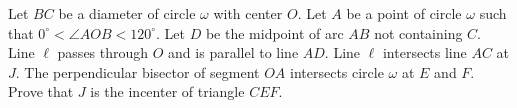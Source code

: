 Let $BC$ be a diameter of circle $\omega$ with center $O$. Let $A$ be a point
of circle $\omega$ such that $0^\circ < \angle AOB < 120^\circ$. Let $D$ be the midpoint
of arc $AB$ not containing $C$. Line $\ell$ passes through $O$ and is
parallel to line $AD$. Line $\ell$ intersects line $AC$ at $J$.
The perpendicular bisector of segment $OA$ intersects circle $\omega$ at $E$
and $F$. Prove that $J$ is the incenter of triangle $CEF$.